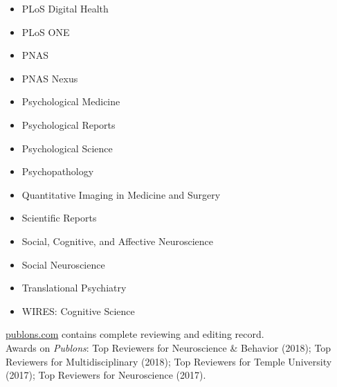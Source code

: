\documentclass[11pt, letterpaper]{article}
\begin{document}
\begin{multicols}{2}
\begin{itemize}[noitemsep]
\item PLoS Digital Health 
\item PLoS ONE 
\item PNAS
\item PNAS Nexus
\item Psychological Medicine 
\item Psychological Reports
\item Psychological Science 
\item Psychopathology 
\item Quantitative Imaging in Medicine and Surgery
\item Scientific Reports 
\item Social, Cognitive, and Affective Neuroscience 
\item Social Neuroscience
\item Translational Psychiatry
\item WIRES: Cognitive Science
\end{itemize}
\end{multicols}

\aiPublons \hspace{.05cm} \href{https://publons.com/author/1204254/david-v-smith}{publons.com} contains complete reviewing and editing record. \\ [.2cm]
Awards on \textit{Publons}: Top Reviewers for Neuroscience \& Behavior (2018); Top Reviewers for Multidisciplinary (2018); Top Reviewers for Temple University (2017); Top Reviewers for Neuroscience (2017).
\end{document}
